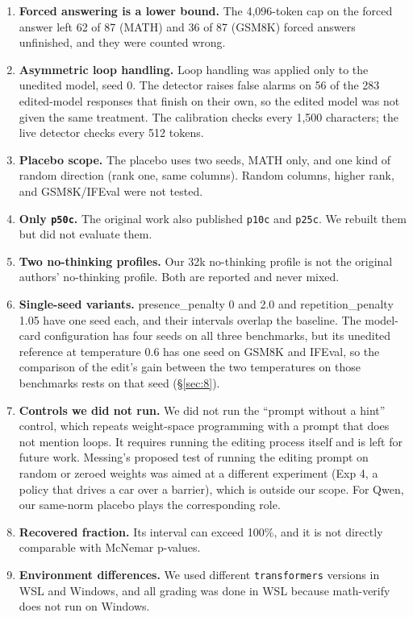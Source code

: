 \documentclass[11pt]{article}
\begin{document}
\begin{enumerate}[nosep,leftmargin=*]
\item \textbf{Forced answering is a lower bound.} The 4,096-token cap on the forced answer left 62 of 87 (MATH) and 36 of 87 (GSM8K) forced answers unfinished, and they were counted wrong.
\item \textbf{Asymmetric loop handling.} Loop handling was applied only to the unedited model, seed 0. The detector raises false alarms on 56 of the 283 edited-model responses that finish on their own, so the edited model was not given the same treatment. The calibration checks every 1,500 characters; the live detector checks every 512 tokens.
\item \textbf{Placebo scope.} The placebo uses two seeds, MATH only, and one kind of random direction (rank one, same columns). Random columns, higher rank, and GSM8K/IFEval were not tested.
\item \textbf{Only \texttt{p50c}.} The original work also published \texttt{p10c} and \texttt{p25c}. We rebuilt them but did not evaluate them.
\item \textbf{Two no-thinking profiles.} Our 32k no-thinking profile is not the original authors' no-thinking profile. Both are reported and never mixed.
\item \textbf{Single-seed variants.} presence\_\allowbreak{}penalty 0 and 2.0 and repetition\_\allowbreak{}penalty 1.05 have one seed each, and their intervals overlap the baseline. The model-card configuration has four seeds on all three benchmarks, but its unedited reference at temperature 0.6 has one seed on GSM8K and IFEval, so the comparison of the edit's gain between the two temperatures on those benchmarks rests on that seed (\S\ref{sec:8}).
\item \textbf{Controls we did not run.} We did not run the ``prompt without a hint'' control, which repeats weight-space programming with a prompt that does not mention loops. It requires running the editing process itself and is left for future work. Messing's proposed test of running the editing prompt on random or zeroed weights was aimed at a different experiment (Exp 4, a policy that drives a car over a barrier), which is outside our scope. For Qwen, our same-norm placebo plays the corresponding role.
\item \textbf{Recovered fraction.} Its interval can exceed 100\%, and it is not directly comparable with McNemar p-values.
\item \textbf{Environment differences.} We used different \texttt{transformers} versions in WSL and Windows, and all grading was done in WSL because math-verify does not run on Windows.

\end{enumerate}
\end{document}

